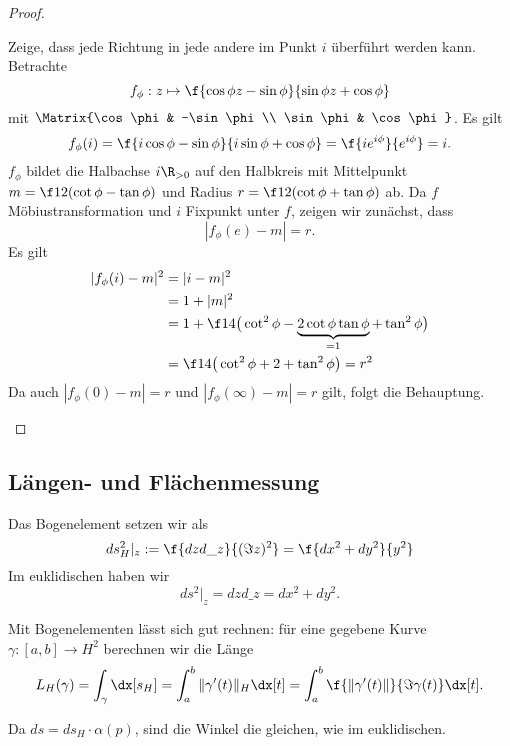 \begin{st}
\begin{proof}
\begin{enumerate}[1)]
				Zeige, dass jede Richtung in jede andere im Punkt $i$ überführt werden kann.
				Betrachte
				\[
					f_\phi : z \mapsto \f{\cos \phi z - \sin \phi}{\sin \phi z + \cos \phi}
				\]
				mit $\Matrix{\cos \phi & -\sin \phi \\ \sin \phi & \cos \phi}$.
				Es gilt
				\[
					f_\phi(i)
					= \f{i \cos \phi - \sin \phi}{i \sin \phi + \cos \phi}
					= \f {i e^{i\phi}}{e^{i \phi}}
					= i.
				\]
				$f_\phi$ bildet die Halbachse $i \R_{> 0}$ auf den Halbkreis mit Mittelpunkt $m = \f 12 (\cot \phi - \tan \phi)$ und Radius $r = \f 12 (\cot \phi + \tan \phi)$ ab.
				Da $f$ Möbiustransformation und $i$ Fixpunkt unter $f$, zeigen wir zunächst, dass
				\[
					|f_\phi(e) - m | = r.
				\]
				Es gilt
				\begin{align*}
					|f_\phi(i) - m|^2
					&= |i - m|^2 \\
					&= 1 + |m|^2 \\
					&= 1 + \f 14 \big( \cot^2 \phi - \underbrace{2 \cot\phi \tan \phi}_{=1} + \tan^2 \phi \big) \\
					&= \f 14 \big( \cot^2 \phi + 2 + \tan^2 \phi \big)
					= r^2
				\end{align*}
				Da auch $|f_\phi(0) - m| = r$ und $|f_\phi(\infty) - m| = r$ gilt, folgt die Behauptung.
		\end{enumerate}
	\end{proof}
\end{st}

\subsection{Längen- und Flächenmessung}

Das Bogenelement setzen wir als
\[
	d s_H^2 |_z
	:= \f{dz d\_z}{(\Im z)^2}
	= \f{dx^2 + dy^2}{y^2}
\]
Im euklidischen haben wir
\[
	ds^2 |_z
	= dz d\_z
	= dx^2 + dy^2.
\]

Mit Bogenelementen lässt sich gut rechnen:
für eine gegebene Kurve $\gamma: [a,b] \to H^2$ berechnen wir die Länge
\[
	L_H(\gamma)
	= \int_\gamma \dx[s_H]
	= \int_a^b \|\gamma'(t)\|_H \dx[t]
	= \int_a^b \f{\|\gamma'(t)\|}{\Im \gamma(t)} \dx[t].
\]

Da $ds = ds_H \cdot \alpha(p)$, sind die Winkel die gleichen, wie im euklidischen.

